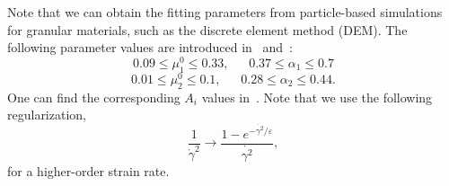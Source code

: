 \noindent
Note that we can obtain the fitting parameters from particle-based simulations for granular materials, such as the discrete element method (DEM). The following parameter values are introduced in~\cite{jop_constitutive_2006} and~\cite{srivastava_viscometric_2021}:
    \[
    0.09 \leq \mu_1^0 \leq 0.33, 
    \ \ \ \ \ \ \ 
    0.37 \leq \alpha_1 \leq 0.7
    \]
        \[
    0.01 \leq \mu_2^0 \leq 0.1, 
    \ \ \ \ \ \ \ 
    0.28 \leq \alpha_2 \leq 0.44.
    \]
One can find the corresponding $A_i$ values in~\cite{srivastava_viscometric_2021}.
Note that we use the following regularization,
\begin{equation}
  \frac{1}{\dot{\gamma}^2} \rightarrow \frac{1-e^{-\dot{\gamma^2} / \varepsilon}}{\dot{\gamma^2}},
\end{equation}
for a higher-order strain rate.

